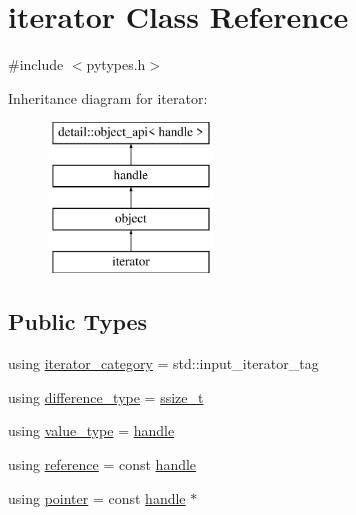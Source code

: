 \hypertarget{classiterator}{}\section{iterator Class Reference}
\label{classiterator}


{\ttfamily \#include $<$pytypes.\+h$>$}

Inheritance diagram for iterator\+:\begin{figure}[H]
\begin{center}
\leavevmode
\includegraphics[height=4.000000cm]{classiterator}
\end{center}
\end{figure}
\subsection*{Public Types}
\begin{DoxyCompactItemize}
\item 
using \mbox{\hyperlink{classiterator_ab77598aff5149ea763f55e0a375c58bd}{iterator\+\_\+category}} = std\+::input\+\_\+iterator\+\_\+tag
\item 
using \mbox{\hyperlink{classiterator_a573d7d10c131e60e9dbc7f691a3c03b1}{difference\+\_\+type}} = \mbox{\hyperlink{detail_2common_8h_ac430d16fc097b3bf0a7469cfd09decda}{ssize\+\_\+t}}
\item 
using \mbox{\hyperlink{classiterator_abe68ba19a8452dd80cf2c893c1feb9d6}{value\+\_\+type}} = \mbox{\hyperlink{classhandle}{handle}}
\item 
using \mbox{\hyperlink{classiterator_af05a87057b5891fb984648429ca60492}{reference}} = const \mbox{\hyperlink{classhandle}{handle}}
\item 
using \mbox{\hyperlink{classiterator_a47f6aa746357c82353203dfcbe8d8c1c}{pointer}} = const \mbox{\hyperlink{classhandle}{handle}} $\ast$
\end{DoxyCompactItemize}
